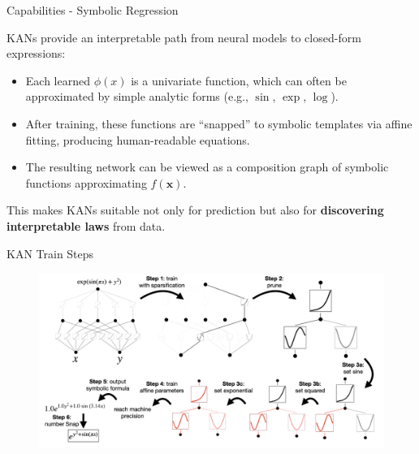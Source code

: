 \documentclass[aspectratio=169]{beamer}
\begin{document}

\begin{frame}{Capabilities - Symbolic Regression}
	
	KANs provide an interpretable path from neural models to closed-form expressions:
	
	\begin{itemize}
		\item Each learned $\phi(x)$ is a univariate function, which can often be approximated by simple analytic forms (e.g., $\sin$, $\exp$, $\log$).
		\item After training, these functions are ``snapped'' to symbolic templates via affine fitting, producing human-readable equations.
		\item The resulting network can be viewed as a composition graph of symbolic functions approximating $f(\mathbf{x})$.
	\end{itemize}
	
	This makes KANs suitable not only for prediction but also for \textbf{discovering interpretable laws} from data.
	
\end{frame}


\begin{frame}{KAN Train Steps}
	
	\begin{figure}
		\centering
		\includegraphics[height=0.8\textheight]{../images/kan_training.png}
	\end{figure}
	
\end{frame}

\end{document}
